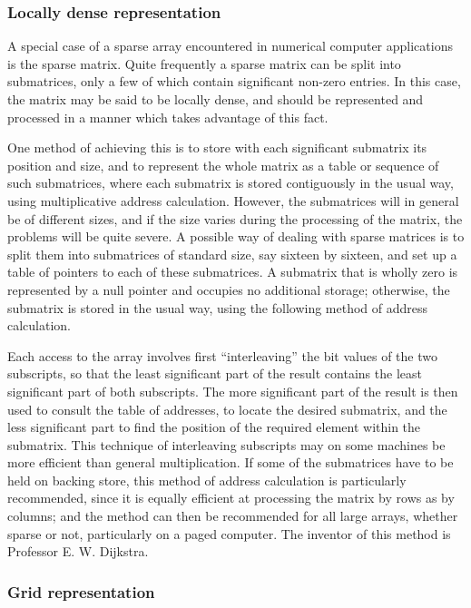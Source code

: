 \subsubsection{Locally dense representation}

A special case of a sparse array encountered in numerical computer applications is the sparse matrix. Quite frequently a sparse matrix can be split into submatrices, only a few of which contain significant non-zero entries. In this case, the matrix may be said to be locally dense, and should be represented and processed in a manner which takes advantage of this fact.

One method of achieving this is to store with each significant submatrix its position and size, and to represent the whole matrix as a table or sequence of such submatrices, where each submatrix is stored contiguously in the usual way, using multiplicative address calculation. However, the submatrices will in general be of different sizes, and if the size varies during the processing of the matrix, the problems will be quite severe. A possible way of dealing with sparse matrices is to split them into submatrices of standard size, say sixteen by sixteen, and set up a table of pointers to each of these submatrices. A submatrix that is wholly zero is represented by a null pointer and occupies no additional storage; otherwise, the submatrix is stored in the usual way, using the following method of address calculation.

Each access to the array involves first ``interleaving'' the bit values of the two subscripts, so that the least significant part of the result contains the least significant part of both subscripts. The more significant part of the result is then used to consult the table of addresses, to locate the desired submatrix, and the less significant part to find the position of the required element within the submatrix. This technique of interleaving subscripts may on some machines be more efficient than general multiplication. If some of the submatrices have to be held on backing store, this method of address calculation is particularly recommended, since it is equally efficient at processing the matrix by rows as by columns; and the method can then be recommended for all large arrays, whether sparse or not, particularly on a paged computer. The inventor of this method is Professor E. W. Dijkstra.

\subsubsection{Grid representation}

